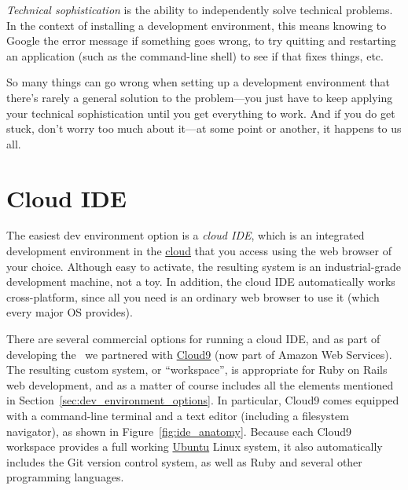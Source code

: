 \begin{aside}
\label{aside:technical_sophistication}

\emph{Technical sophistication} is the ability to independently solve technical problems. In the context of installing a development environment, this means knowing to Google the error message if something goes wrong, to try quitting and restarting an application (such as the command-line shell) to see if that fixes things, etc.

So many things can go wrong when setting up a development environment that there's rarely a general solution to the problem---you just have to keep applying your technical sophistication until you get everything to work. And if you do get stuck, don't worry too much about it---at some point or another, it happens to us all.

\end{aside}



\section{Cloud IDE}
\label{sec:cloud_ide}

The easiest dev environment option is a \emph{cloud IDE}, which is an integrated development environment in the \href{https://en.wikipedia.org/wiki/Cloud_computing}{cloud} that you access using the web browser of your choice. Although easy to activate, the resulting system is an industrial-grade development machine, not a toy. In addition, the cloud IDE automatically works cross-platform, since all you need is an ordinary web browser to use it (which every major OS provides).

There are several commercial options for running a cloud IDE, and as part of developing the \rort\ we partnered with \href{http://c9.io/}{Cloud9} (now part of Amazon Web Services). The resulting custom system, or ``workspace'', is appropriate for Ruby on Rails web development, and as a matter of course includes all the elements mentioned in Section~\ref{sec:dev_environment_options}. In particular, Cloud9 comes equipped with a command-line terminal and a text editor (including a filesystem navigator), as shown in Figure~\ref{fig:ide_anatomy}. Because each Cloud9 workspace provides a full working \href{https://www.ubuntu.com/}{Ubuntu} Linux system, it also automatically includes the Git version control system, as well as Ruby and several other programming languages.

